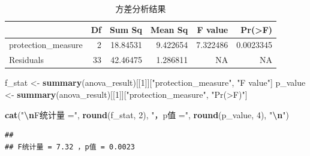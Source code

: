 \documentclass[
  twoside,12pt,fontset=none]{ctexbook}
\newenvironment{Shaded}{\begin{snugshade}}{\end{snugshade}}
\newcommand{\DecValTok}[1]{\textcolor[rgb]{0.00,0.00,0.81}{#1}}
\newcommand{\FunctionTok}[1]{\textcolor[rgb]{0.13,0.29,0.53}{\textbf{#1}}}
\newcommand{\NormalTok}[1]{#1}
\newcommand{\OtherTok}[1]{\textcolor[rgb]{0.56,0.35,0.01}{#1}}
\newcommand{\SpecialCharTok}[1]{\textcolor[rgb]{0.81,0.36,0.00}{\textbf{#1}}}
\newcommand{\StringTok}[1]{\textcolor[rgb]{0.31,0.60,0.02}{#1}}
\begin{document}
\begin{table}[!h]
\centering
\caption{\label{tab:multiple-comparison-anova}方差分析结果}
\centering
\begin{tabular}[t]{lrrrrr}
\toprule
  & Df & Sum Sq & Mean Sq & F value & Pr(>F)\\
\midrule
protection\_measure & 2 & 18.84531 & 9.422654 & 7.322486 & 0.0023345\\
Residuals & 33 & 42.46475 & 1.286811 & NA & NA\\
\bottomrule
\end{tabular}
\end{table}

\begin{Shaded}
\begin{Highlighting}[]
\NormalTok{f\_stat }\OtherTok{\textless{}{-}} \FunctionTok{summary}\NormalTok{(anova\_result)[[}\DecValTok{1}\NormalTok{]][}\StringTok{"protection\_measure"}\NormalTok{, }\StringTok{"F value"}\NormalTok{]}
\NormalTok{p\_value }\OtherTok{\textless{}{-}} \FunctionTok{summary}\NormalTok{(anova\_result)[[}\DecValTok{1}\NormalTok{]][}\StringTok{"protection\_measure"}\NormalTok{, }\StringTok{"Pr(\textgreater{}F)"}\NormalTok{]}

\FunctionTok{cat}\NormalTok{(}\StringTok{"}\SpecialCharTok{\textbackslash{}n}\StringTok{F统计量 ="}\NormalTok{, }\FunctionTok{round}\NormalTok{(f\_stat, }\DecValTok{2}\NormalTok{), }\StringTok{"，p值 ="}\NormalTok{, }\FunctionTok{round}\NormalTok{(p\_value, }\DecValTok{4}\NormalTok{), }\StringTok{"}\SpecialCharTok{\textbackslash{}n}\StringTok{"}\NormalTok{)}
\end{Highlighting}
\end{Shaded}

\begin{verbatim}
## 
## F统计量 = 7.32 ，p值 = 0.0023
\end{verbatim}
\end{document}
